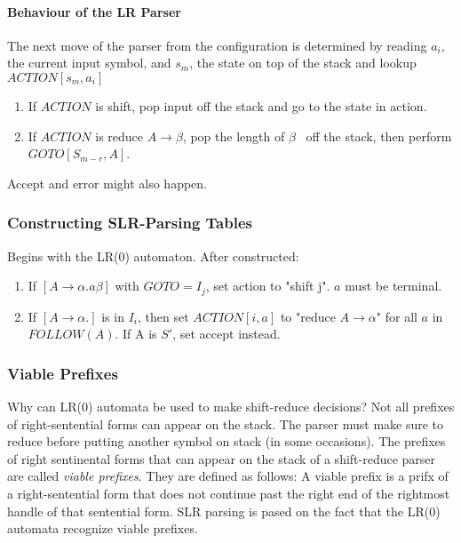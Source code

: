 \documentclass{article}
\begin{document}
\paragraph{Behaviour of the LR Parser} %
\label{par:Behaviour of the LR Parser}
The next move of the parser from the configuration is determined by reading $a_i$, the current input symbol, and $s_m$, the state on top of the stack and lookup $ACTION[s_m, a_i]$
\begin{enumerate}
	\item If $ACTION$ is shift, pop input off the stack and go to the state in action.
	\item If $ACTION$ is reduce $A \to \beta$, pop the length of $\beta$~ off the stack, then perform $GOTO[S_{m-r},A]$.
\end{enumerate}
Accept and error might also happen.


\subsubsection{Constructing SLR-Parsing Tables} %
\label{ssub:Constructing SLR-Parsing Tables}
Begins with the LR(0) automaton. After constructed:
\begin{enumerate}
	\item If $[A \to \alpha .a\beta]$ with $GOTO = I_j$, set action to "shift j". $a$ must be terminal.
	\item If $[A \to \alpha .]$ is in $I_i$, then set $ACTION[i,a]$ to "reduce $A \to \alpha$" for all $a$ in $FOLLOW(A)$. If A is $S'$, set accept instead.
\end{enumerate}

\subsubsection{Viable Prefixes} %
\label{ssub:Viable Prefixes}
Why can LR(0) automata be used to make shift-reduce decisions? Not all prefixes of right-sentential forms can appear on the stack. The parser must make sure to reduce before putting another symbol on stack (in some occasions). The prefixes of right sentinental forms that can appear on the stack of a shift-reduce parser are called \emph{viable prefixes}. They are defined as follows: A viable prefix is a prifx of a right-sentential form that does not continue past the right end of the rightmost handle of that sentential form. SLR parsing is pased on the fact that the LR(0) automata recognize viable prefixes.
\end{document}
